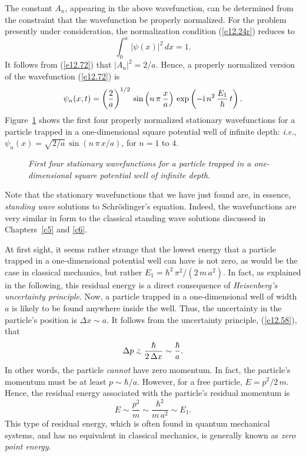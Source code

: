 The constant $A_n$, appearing in the above wavefunction,  can be determined from the constraint that the
wavefunction be properly normalized. For the  problem presently under consideration, the normalization condition (\ref{e12.24r})
reduces to
\begin{equation}
\int_0^a\,|\psi(x)|^2\,dx = 1.
\end{equation}
It follows from (\ref{e12.72}) that $|A_n|^2=2/a$. Hence, a properly normalized version of the  wavefunction (\ref{e12.72})
is 
\begin{equation}
\psi_n(x,t) = \left(\frac{2}{a}\right)^{1/2}\,\sin\left(n\,\pi\,\frac{x}{a}\right)\,\exp\left(-{\rm i}\,n^2\,\frac{E_1}{\hbar}\,t\right).
\end{equation}
Figure~\ref{f12.5} shows the first four properly normalized stationary wavefunctions for a particle trapped in a one-dimensional
square potential well of infinite depth: {\em i.e.},  $\psi_n(x)= \sqrt{2/a}\,\sin(n\,\pi\,x/a)$,
for $n=1$ to $4$. 

\begin{figure}
\epsfysize=4in
\centerline{}
\caption{\em First four stationary wavefunctions for  a particle trapped in a one-dimensional
square potential well of infinite depth.}\label{f12.5}   
\end{figure}

Note that the stationary wavefunctions that we have just found are, in essence, {\em standing wave}\/ solutions to Schr\"{o}dinger's equation. 
Indeed, the wavefunctions are very similar in form to the classical standing wave solutions discussed in Chapters~\ref{c5}
and \ref{c6}.  

At first sight, it seems rather strange that the lowest energy that a particle trapped in a one-dimensional
potential well can have is not zero, as would be the case in classical mechanics, but rather $E_1= \hbar^2\,\pi^2/(2\,m\,a^2)$. In fact,
as explained in the following, this residual energy is a direct consequence of {\em Heisenberg's uncertainty principle}. Now,  a
particle trapped in a one-dimensional well of width $a$ is likely to be found
anywhere inside the well. Thus, the uncertainty in the particle's position is $\Delta x\sim a$. It
follows from the uncertainty principle, (\ref{e12.58}), that
\begin{equation}
\Delta p \stackrel {_{\normalsize>}}{_{\normalsize \sim}} \frac{\hbar}{2\,\Delta x}\sim \frac{\hbar}{a}.
\end{equation}
In other words, the particle {\em cannot}\/ have zero momentum. In fact, the particle's momentum
must be at least $p\sim \hbar/a$. 
However, for a free particle, $E=p^2/2\,m$. Hence, the residual energy associated with the
particle's residual momentum is
\begin{equation}
E \sim \frac{p^2}{m}\sim \frac{\hbar^2}{m\,a^2}\sim E_1.
\end{equation}
This type of residual energy, which is often found in quantum mechanical systems, and has no equivalent in classical
mechanics, is generally known as {\em zero point energy}. 

